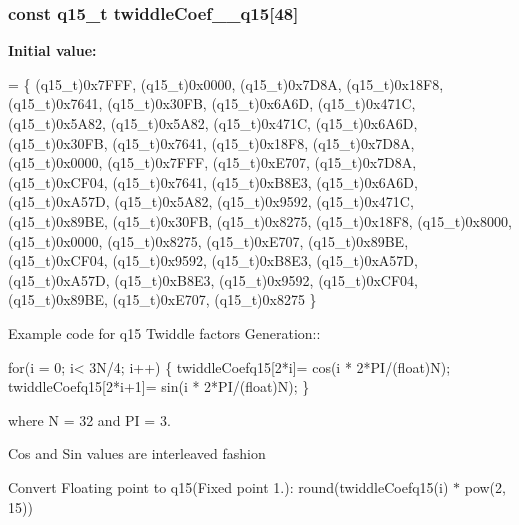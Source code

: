 \subsubsection[{\texorpdfstring{twiddle\+Coef\+\_\+32\+\_\+q15}{twiddleCoef_32_q15}}]{\setlength{\rightskip}{0pt plus 5cm}const q15\+\_\+t twiddle\+Coef\+\_\+\_\+q15\mbox{[}48\mbox{]}}\hypertarget{group__CFFT__CIFFT_gac194a4fe04a19051ae1811f69c6e5df2}{}\label{group__CFFT__CIFFT_gac194a4fe04a19051ae1811f69c6e5df2}
{\bfseries Initial value\+:}
\begin{DoxyCode}
= \{
    (q15\_t)0x7FFF, (q15\_t)0x0000,
    (q15\_t)0x7D8A, (q15\_t)0x18F8,
    (q15\_t)0x7641, (q15\_t)0x30FB,
    (q15\_t)0x6A6D, (q15\_t)0x471C,
    (q15\_t)0x5A82, (q15\_t)0x5A82,
    (q15\_t)0x471C, (q15\_t)0x6A6D,
    (q15\_t)0x30FB, (q15\_t)0x7641,
    (q15\_t)0x18F8, (q15\_t)0x7D8A,
    (q15\_t)0x0000, (q15\_t)0x7FFF,
    (q15\_t)0xE707, (q15\_t)0x7D8A,
    (q15\_t)0xCF04, (q15\_t)0x7641,
    (q15\_t)0xB8E3, (q15\_t)0x6A6D,
    (q15\_t)0xA57D, (q15\_t)0x5A82,
    (q15\_t)0x9592, (q15\_t)0x471C,
    (q15\_t)0x89BE, (q15\_t)0x30FB,
    (q15\_t)0x8275, (q15\_t)0x18F8,
    (q15\_t)0x8000, (q15\_t)0x0000,
    (q15\_t)0x8275, (q15\_t)0xE707,
    (q15\_t)0x89BE, (q15\_t)0xCF04,
    (q15\_t)0x9592, (q15\_t)0xB8E3,
    (q15\_t)0xA57D, (q15\_t)0xA57D,
    (q15\_t)0xB8E3, (q15\_t)0x9592,
    (q15\_t)0xCF04, (q15\_t)0x89BE,
    (q15\_t)0xE707, (q15\_t)0x8275
\}
\end{DoxyCode}
\begin{DoxyParagraph}{}
Example code for q15 Twiddle factors Generation\+:\+: 
\end{DoxyParagraph}
\begin{DoxyParagraph}{}

\begin{DoxyPre}for(i = 0; i< 3N/4; i++)
\{
   twiddleCoefq15[2*i]= cos(i * 2*PI/(float)N);
   twiddleCoefq15[2*i+1]= sin(i * 2*PI/(float)N);
\} \end{DoxyPre}
 
\end{DoxyParagraph}
\begin{DoxyParagraph}{}
where N = 32 and PI = 3. 
\end{DoxyParagraph}
\begin{DoxyParagraph}{}
Cos and Sin values are interleaved fashion 
\end{DoxyParagraph}
\begin{DoxyParagraph}{}
Convert Floating point to q15(Fixed point 1.)\+: round(twiddle\+Coefq15(i) $\ast$ pow(2, 15)) 
\end{DoxyParagraph}
